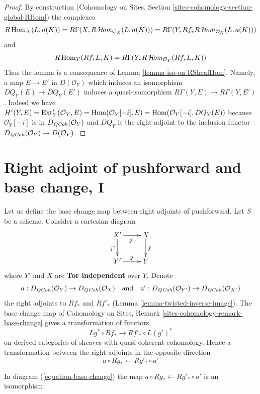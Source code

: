 \begin{proof}
By construction (Cohomology on Sites, Section
\ref{sites-cohomology-section-global-RHom}) the complexes
$$
R\mathop{\mathrm{Hom}}\nolimits_X(L, a(K)) =
R\Gamma(X, R\mathop{\mathcal{H}\!\mathit{om}}\nolimits_{\mathcal{O}_X}(L, a(K))) =
R\Gamma(Y, Rf_*R\mathop{\mathcal{H}\!\mathit{om}}\nolimits_{\mathcal{O}_X}(L, a(K)))
$$
and
$$
R\mathop{\mathrm{Hom}}\nolimits_Y(Rf_*L, K) = R\Gamma(Y, R\mathop{\mathcal{H}\!\mathit{om}}\nolimits_{\mathcal{O}_Y}(Rf_*L, K))
$$
Thus the lemma is a consequence of Lemma \ref{lemma-iso-on-RSheafHom}.
Namely, a map $E \to E'$ in $D(\mathcal{O}_Y)$ which induces
an isomorphism $DQ_Y(E) \to DQ_Y(E')$ induces a quasi-isomorphism
$R\Gamma(Y, E) \to R\Gamma(Y, E')$. Indeed we have
$H^i(Y, E) = \mathop{\mathrm{Ext}}\nolimits^i_Y(\mathcal{O}_Y, E) = \mathop{\mathrm{Hom}}\nolimits(\mathcal{O}_Y[-i], E) =
\mathop{\mathrm{Hom}}\nolimits(\mathcal{O}_Y[-i], DQ_Y(E))$ because $\mathcal{O}_Y[-i]$
is in $D_{\mathit{QCoh}}(\mathcal{O}_Y)$ and $DQ_Y$ is the right adjoint
to the inclusion functor $D_{\mathit{QCoh}}(\mathcal{O}_Y) \to D(\mathcal{O}_Y)$.
\end{proof}









\section{Right adjoint of pushforward and base change, I}
\label{section-base-change-map}

\noindent
Let us define the base change map between right adjoints of pushforward.
Let $S$ be a scheme. Consider a cartesian diagram
\begin{equation}
\label{equation-base-change}
\vcenter{
\xymatrix{
X' \ar[r]_{g'} \ar[d]_{f'} & X \ar[d]^f \\
Y' \ar[r]^g & Y
}
}
\end{equation}
where $Y'$ and $X$ are {\bf Tor independent} over $Y$. Denote
$$
a  : D_{\mathit{QCoh}}(\mathcal{O}_Y) \to D_{\mathit{QCoh}}(\mathcal{O}_X)
\quad\text{and}\quad
a' : D_{\mathit{QCoh}}(\mathcal{O}_{Y'}) \to D_{\mathit{QCoh}}(\mathcal{O}_{X'})
$$
the right adjoints to $Rf_*$ and $Rf'_*$
(Lemma \ref{lemma-twisted-inverse-image}).
The base change map of
Cohomology on Sites, Remark \ref{sites-cohomology-remark-base-change}
gives a transformation of functors
$$
Lg^* \circ Rf_* \longrightarrow Rf'_* \circ L(g')^*
$$
on derived categories of sheaves with quasi-coherent cohomology.
Hence a transformation between the right adjoints in the opposite direction
$$
a \circ Rg_* \longleftarrow Rg'_* \circ a'
$$

\begin{lemma}
\label{lemma-flat-precompose-pus}
In diagram (\ref{equation-base-change}) the map
$a \circ Rg_* \leftarrow Rg'_* \circ a'$ is an isomorphism.
\end{lemma}

